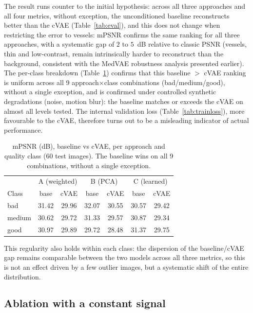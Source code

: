 \documentclass[conference]{IEEEtran}
\begin{document}
The result runs counter to the initial hypothesis: across all three
approaches and all four metrics, without exception, the unconditioned
baseline reconstructs better than the cVAE (Table~\ref{tab:eval}), and
this does not change when restricting the error to vessels: mPSNR confirms
the same ranking for all three approaches, with a systematic gap of $2$ to
$5$~dB relative to classic PSNR (vessels, thin and low-contrast, remain
intrinsically harder to reconstruct than the background,
consistent with the MedVAE robustness analysis presented earlier). The
per-class breakdown (Table~\ref{tab:mpsnr-class}) confirms that this
baseline $>$ cVAE ranking is uniform across all 9
approach$\times$class combinations (bad/medium/good), without a single
exception, and is confirmed under controlled synthetic degradations
(noise, motion blur): the baseline matches or exceeds the cVAE on almost
all levels tested. The internal validation loss
(Table~\ref{tab:trainloss}), more favourable to the cVAE, therefore turns
out to be a misleading indicator of actual performance.

\begin{table}[htbp]
  \centering
  \footnotesize
  \begin{tabular}{@{}lcccccc@{}}
    \toprule
    & \multicolumn{2}{c}{A (weighted)} & \multicolumn{2}{c}{B (PCA)} & \multicolumn{2}{c}{C (learned)} \\
    Class & base & cVAE & base & cVAE & base & cVAE \\
    \midrule
    bad    & 31.42 & 29.96 & 32.07 & 30.55 & 30.57 & 29.42 \\
    medium & 30.62 & 29.72 & 31.33 & 29.57 & 30.87 & 29.34 \\
    good   & 30.97 & 29.89 & 29.72 & 28.48 & 31.37 & 29.75 \\
    \bottomrule
  \end{tabular}
  \caption{mPSNR (dB), baseline vs cVAE, per approach and quality class
  (60 test images). The baseline wins on all 9 combinations, without a
  single exception.}
  \label{tab:mpsnr-class}
\end{table}

This regularity also holds within each class: the dispersion of the
baseline/cVAE gap remains comparable between the two models across all
three metrics, so this is not an effect driven by a few outlier images,
but a systematic shift of the entire distribution.

\FloatBarrier
\subsection{Ablation with a constant signal}
\label{sec:ablation}
\end{document}
